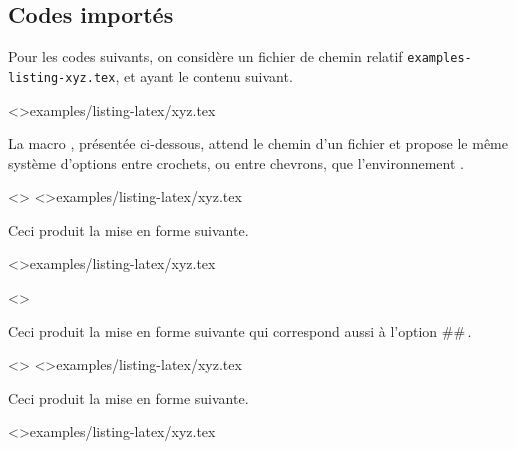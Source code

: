 \documentclass{tutodoc}
\begin{document}
\subsection{Codes importés}

Pour les codes suivants, on considère un fichier de chemin relatif \verb+examples-listing-xyz.tex+, et ayant le contenu suivant.


\tdoclatexinput<>{examples/listing-latex/xyz.tex}


\medskip


La macro , présentée ci-dessous, attend le chemin d'un fichier et propose le même système d'options entre crochets, ou entre chevrons, que l'environnement .


\begin{tdocexa}
    \leavevmode

    \begin{tdoclatex}<>
\tdoclatexinput<>{examples/listing-latex/xyz.tex}
    \end{tdoclatex}

    Ceci produit la mise en forme suivante.

    \tdoclatexinput<>{examples/listing-latex/xyz.tex}
\end{tdocexa}


\begin{tdocexa}[À la suite]
    \leavevmode

    \begin{tdoclatex}<>
    \end{tdoclatex}

    Ceci produit la mise en forme suivante qui correspond aussi à l'option \tdoclatexin##\,.

\end{tdocexa}


\begin{tdocexa}
    \leavevmode

    \begin{tdoclatex}<>
\tdoclatexinput<>{examples/listing-latex/xyz.tex}
    \end{tdoclatex}

    Ceci produit la mise en forme suivante.

    \tdoclatexinput<>{examples/listing-latex/xyz.tex}
\end{tdocexa}
\end{document}
